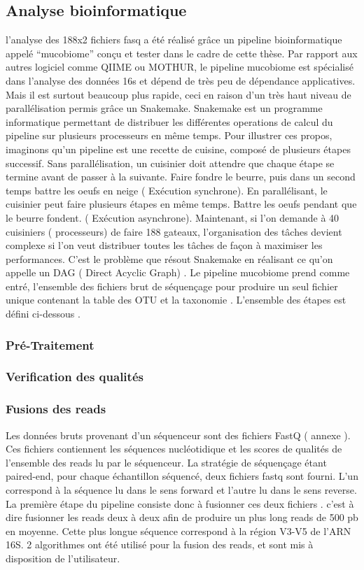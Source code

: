 \documentclass[12pt,a4paper]{article}
\begin{document}
\subsection{Analyse bioinformatique}

l’analyse des 188x2 fichiers fasq a été réalisé grâce un pipeline bioinformatique appelé “mucobiome” conçu et tester dans le cadre de cette thèse. Par rapport aux autres logiciel comme QIIME ou MOTHUR, le pipeline mucobiome est spécialisé dans l’analyse des données 16s et dépend de très peu de dépendance applicatives. Mais il est surtout beaucoup plus rapide, ceci en raison d’un très haut niveau de parallélisation permis grâce un Snakemake. Snakemake est un programme informatique permettant de distribuer les différentes operations de calcul du pipeline sur plusieurs processeurs en même temps. Pour illustrer ces propos, imaginons qu’un pipeline est une recette de cuisine, composé de plusieurs étapes successif. Sans parallélisation, un cuisinier doit attendre que chaque étape se termine avant de passer à la suivante. Faire fondre le beurre, puis dans un second temps battre les oeufs en neige ( Exécution synchrone). En parallélisant, le cuisinier peut faire plusieurs étapes en même temps. Battre les oeufs pendant que le beurre fondent. ( Exécution asynchrone). Maintenant, si l’on demande à 40 cuisiniers ( processeurs) de faire 188 gateaux, l’organisation des tâches devient complexe si l’on veut distribuer toutes les tâches de façon à maximiser les performances. C’est le problème que résout Snakemake en réalisant ce qu’on appelle un DAG ( Direct Acyclic Graph) .
Le pipeline mucobiome prend comme entré, l’ensemble des fichiers brut de séquençage pour produire un seul fichier unique contenant la table des OTU et la taxonomie . L’ensemble des étapes est défini ci-dessous .

\subsubsection{Pré-Traitement}

\subsubsection{Verification des qualités}

\subsubsection{Fusions des reads}

Les données bruts provenant d’un séquenceur sont des fichiers FastQ ( annexe ). Ces fichiers contiennent les séquences nucléotidique et les scores de qualités de l’ensemble des reads lu par le séquenceur. La stratégie de séquençage étant paired-end, pour chaque échantillon séquencé, deux fichiers fastq sont fourni. L’un correspond à la séquence lu dans le sens forward et l’autre lu dans le sens reverse.
La première étape du pipeline consiste donc à fusionner ces deux fichiers . c’est à dire fusionner les reads deux à deux afin de produire un plus long reads de 500 pb en moyenne. Cette plus longue séquence correspond à la région V3-V5 de l’ARN 16S.
2 algorithmes ont été utilisé pour la fusion des reads, et sont mis à disposition de l’utilisateur.
\end{document}
